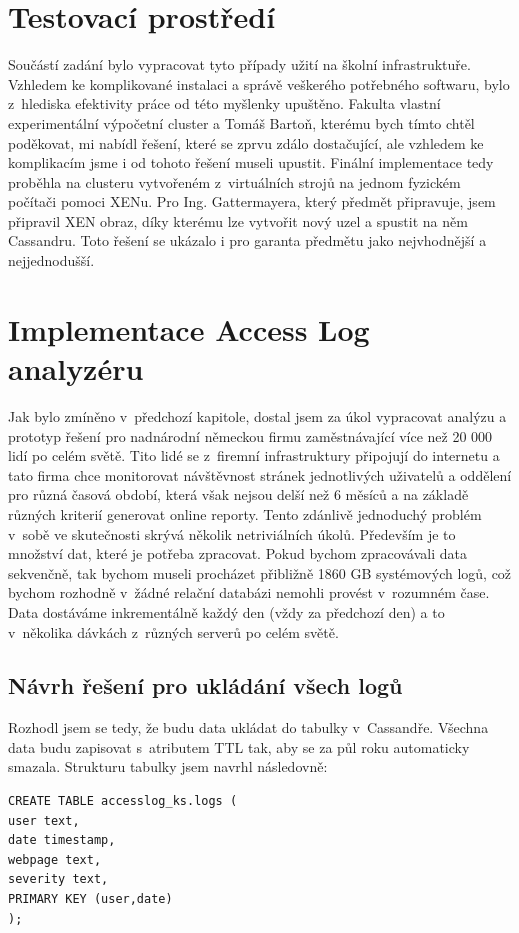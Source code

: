 \section{Testovací prostředí}
Součástí zadání bylo vypracovat tyto případy užití na školní infrastruktuře. Vzhledem ke komplikované instalaci a správě veškerého potřebného softwaru, bylo z~hlediska efektivity práce od této myšlenky upuštěno. Fakulta vlastní experimentální výpočetní cluster a Tomáš Bartoň, kterému bych tímto chtěl poděkovat, mi nabídl řešení, které se zprvu zdálo dostačující, ale vzhledem ke komplikacím jsme i od tohoto řešení museli upustit. Finální implementace tedy proběhla na clusteru vytvořeném z~virtuálních strojů na jednom fyzickém počítači pomoci XENu. Pro Ing. Gattermayera, který předmět připravuje, jsem připravil XEN obraz, díky kterému lze vytvořit nový uzel a spustit na něm Cassandru. Toto řešení se ukázalo i pro garanta předmětu jako nejvhodnější a nejjednodušší. 

\section{Implementace Access Log analyzéru}
Jak bylo zmíněno v~předchozí kapitole, dostal jsem za úkol vypracovat analýzu a prototyp řešení pro nadnárodní německou firmu zaměstnávající více než 20 000 lidí po celém světě. Tito lidé se z~firemní infrastruktury připojují do internetu a tato firma chce monitorovat návštěvnost stránek jednotlivých uživatelů a oddělení pro různá časová období, která však nejsou delší než 6 měsíců a na základě různých kriterií generovat online reporty. Tento zdánlivě jednoduchý problém v~sobě ve skutečnosti skrývá několik netriviálních úkolů. Především je to množství dat, které je potřeba zpracovat. Pokud bychom zpracovávali data sekvenčně, tak bychom museli procházet přibližně 1860 GB systémových logů, což bychom rozhodně v~žádné relační databázi nemohli provést v~rozumném čase. Data dostáváme inkrementálně každý den (vždy za předchozí den) a to v~několika dávkách z~různých serverů po celém světě. 


\subsection{Návrh řešení pro ukládání všech logů}
Rozhodl jsem se tedy, že budu data ukládat do tabulky v~Cassandře. Všechna data budu zapisovat s~atributem TTL tak, aby se za půl roku automaticky smazala. Strukturu tabulky jsem navrhl následovně: 

\begin{lstlisting}[caption={Návrh tabulky pro ukládání všech logů},label=LogTable]
CREATE TABLE accesslog_ks.logs ( 
user text,
date timestamp,
webpage text,
severity text,
PRIMARY KEY (user,date) 
);
\end{lstlisting}

